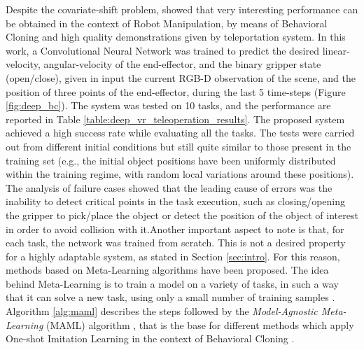 Despite the covariate-shift problem, \cite{zhang2018deep_vr_teleoperation} showed that very interesting performance can be obtained in the context of Robot Manipulation, by means of Behavioral Cloning and high quality demonstrations given by teleportation system. In this work, a Convolutional Neural Network was trained to predict the desired linear-velocity, angular-velocity of the end-effector, and the binary gripper state (open/close), given in input the current RGB-D observation of the scene, and the position of three points of the end-effector, during the last 5 time-steps (Figure \ref{fig:deep_bc}). The system was tested on 10 tasks, and the performance are reported in Table \ref{table:deep_vr_teleoperation_results}. The proposed system achieved a high success rate while evaluating all the tasks. The tests were carried out from different initial conditions but still quite similar to those present in the training set (e.g., the initial object positions have been uniformly distributed within the training regime, with random local variations around these positions). The analysis of failure cases showed that the leading cause of errors was the inability to detect critical points in the task execution, such as closing/opening the gripper to pick/place the object or detect the position of the object of interest in order to avoid collision with it.\unskip Another important aspect to note is that, for each task, the network was trained from scratch. This is not a desired property for a highly adaptable system, as stated in Section \ref{sec:intro}. For this reason, methods based on Meta-Learning algorithms have been proposed. 
\newline The idea behind Meta-Learning is to train a model on a variety of tasks, in such a way that it can solve a new task, using only a small number of training samples \cite{finn2017maml}. Algorithm \ref{alg:maml} describes the steps followed by the \textit{Model-Agnostic Meta-Learning} (MAML) algorithm \cite{finn2017maml}, that is the base for different methods which apply One-shot Imitation Learning in the context of Behavioral Cloning \cite{finn2017one_shot_visual_il,yu2018daml,yu2018one_shot_hil}.
